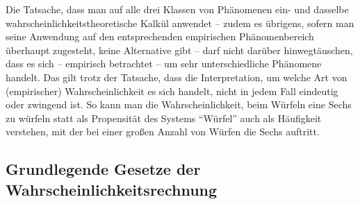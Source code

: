 Die Tatsache, dass man auf alle drei Klassen von Phänomenen ein- und dasselbe
wahrscheinlichkeitstheoretische Kalkül anwendet -- zudem es übrigens, sofern man
seine Anwendung auf den entsprechenden empirischen Phänomenbereich überhaupt
zugesteht, keine Alternative gibt -- darf nicht darüber hinwegtäuschen, dass es
sich -- empirisch betrachtet -- um sehr unterschiedliche Phänomene handelt. Das
gilt trotz der Tatsache, dass die Interpretation, um
welche Art von (empirischer) Wahrscheinlichkeit es sich handelt, nicht
in jedem Fall eindeutig oder zwingend ist. So kann man die Wahrscheinlichkeit,
beim Würfeln eine Sechs zu würfeln statt als Propensität des Systems
"`Würfel"' auch als Häufigkeit verstehen, mit der bei einer großen Anzahl von
Würfen die Sechs auftritt.


\subsection{Grundlegende Gesetze der Wahrscheinlichkeitsrechnung}

